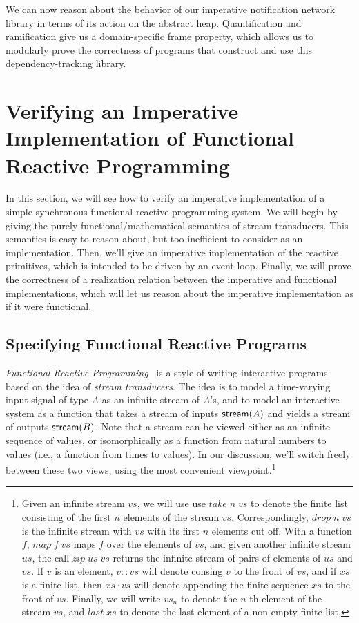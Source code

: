 \documentclass[preprint,natbib]{sigplanconf}
\begin{document}
We can now reason about the behavior of our imperative notification
network library in terms of its action on the abstract
heap. Quantification and ramification give us a domain-specific frame
property, which allows us to modularly prove the correctness of
programs that construct and use this dependency-tracking library.

\section{Verifying an Imperative Implementation of Functional Reactive Programming}

In this section, we will see how to verify an imperative
implementation of a simple synchronous functional reactive programming
system. We will begin by giving the purely functional/mathematical
semantics of stream transducers. This semantics is easy to reason
about, but too inefficient to consider as an implementation. Then,
we'll give an imperative implementation of the reactive primitives,
which is intended to be driven by an event loop. Finally, we will 
prove the correctness of a realization relation between the
imperative and functional implementations, which will let us reason
about the imperative implementation as if it were functional. 

\subsection{Specifying Functional Reactive Programs}

\emph{Functional Reactive Programming}~\cite{frp} is a style of
writing interactive programs based on the idea of \emph{stream
  transducers}.  The idea is to model a time-varying input signal of
type $A$ as an infinite stream of $A$'s, and to model an interactive
system as a function that takes a stream of inputs $\mbox{\textsf{{stream}}}({A})$ and
yields a stream of outputs $\mbox{\textsf{{stream}}}({B})$. Note that a stream can be
viewed either as an infinite sequence of values, or isomorphically as
a function from natural numbers to values (i.e., a function from times
to values). In our discussion, we'll switch freely between these two
views, using the most convenient viewpoint.\footnote{Given an infinite stream $vs$, we will use use $take\;n\;vs$ to denote
the finite list consisting of the first $n$ elements of the stream
$vs$. Correspondingly, $drop\;n\;vs$ is the infinite stream with $vs$
with its first $n$ elements cut off. With a function $f$, $map\;f\;vs$
maps $f$ over the elements of $vs$, and given another infinite stream
$us$, the call $zip\;us\;vs$ returns the infinite stream of pairs of
elements of $us$ and $vs$. If $v$ is an element, $v :: vs$ will 
denote consing $v$ to the front of $vs$, and if $xs$ is a finite list, then
$xs \cdot vs$ will denote appending the finite sequence $xs$ to the
front of $vs$. Finally, we will write $vs_n$ to denote the $n$-th element
of the stream $vs$, and $\mathit{last}\;xs$ to denote the last element of
a non-empty finite list.}
\end{document}
